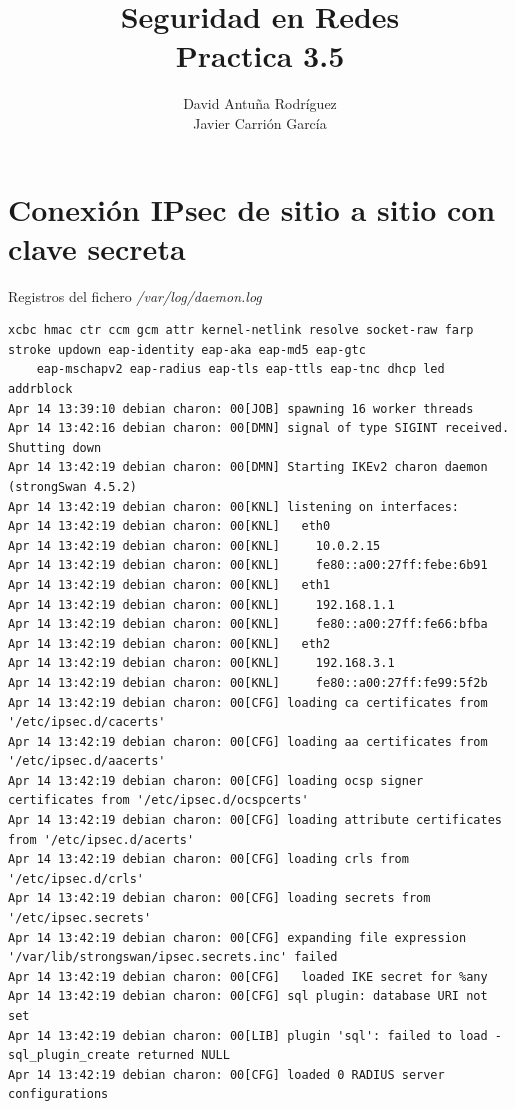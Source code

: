 \documentclass[11pt]{article}
\title{\Large Seguridad en Redes\\Practica 3.5}
\author{David Antuña Rodríguez\\Javier Carrión García}
\date{}
\begin{document}
  \raggedright

  \maketitle
  \newpage

  \section{Conexión IPsec de sitio a sitio con clave secreta}
    \par
    Registros del fichero \textit{/var/log/daemon.log}
    \lstset{basicstyle=\ttfamily\tiny}
\begin{lstlisting}
xcbc hmac ctr ccm gcm attr kernel-netlink resolve socket-raw farp stroke updown eap-identity eap-aka eap-md5 eap-gtc
    eap-mschapv2 eap-radius eap-tls eap-ttls eap-tnc dhcp led addrblock
Apr 14 13:39:10 debian charon: 00[JOB] spawning 16 worker threads
Apr 14 13:42:16 debian charon: 00[DMN] signal of type SIGINT received. Shutting down
Apr 14 13:42:19 debian charon: 00[DMN] Starting IKEv2 charon daemon (strongSwan 4.5.2)
Apr 14 13:42:19 debian charon: 00[KNL] listening on interfaces:
Apr 14 13:42:19 debian charon: 00[KNL]   eth0
Apr 14 13:42:19 debian charon: 00[KNL]     10.0.2.15
Apr 14 13:42:19 debian charon: 00[KNL]     fe80::a00:27ff:febe:6b91
Apr 14 13:42:19 debian charon: 00[KNL]   eth1
Apr 14 13:42:19 debian charon: 00[KNL]     192.168.1.1
Apr 14 13:42:19 debian charon: 00[KNL]     fe80::a00:27ff:fe66:bfba
Apr 14 13:42:19 debian charon: 00[KNL]   eth2
Apr 14 13:42:19 debian charon: 00[KNL]     192.168.3.1
Apr 14 13:42:19 debian charon: 00[KNL]     fe80::a00:27ff:fe99:5f2b
Apr 14 13:42:19 debian charon: 00[CFG] loading ca certificates from '/etc/ipsec.d/cacerts'
Apr 14 13:42:19 debian charon: 00[CFG] loading aa certificates from '/etc/ipsec.d/aacerts'
Apr 14 13:42:19 debian charon: 00[CFG] loading ocsp signer certificates from '/etc/ipsec.d/ocspcerts'
Apr 14 13:42:19 debian charon: 00[CFG] loading attribute certificates from '/etc/ipsec.d/acerts'
Apr 14 13:42:19 debian charon: 00[CFG] loading crls from '/etc/ipsec.d/crls'
Apr 14 13:42:19 debian charon: 00[CFG] loading secrets from '/etc/ipsec.secrets'
Apr 14 13:42:19 debian charon: 00[CFG] expanding file expression '/var/lib/strongswan/ipsec.secrets.inc' failed
Apr 14 13:42:19 debian charon: 00[CFG]   loaded IKE secret for %any
Apr 14 13:42:19 debian charon: 00[CFG] sql plugin: database URI not set
Apr 14 13:42:19 debian charon: 00[LIB] plugin 'sql': failed to load - sql_plugin_create returned NULL
Apr 14 13:42:19 debian charon: 00[CFG] loaded 0 RADIUS server configurations

\end{lstlisting}
\end{document}
